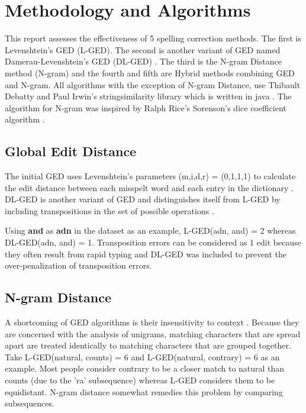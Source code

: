 \documentclass[11pt]{article}
\begin{document}
\section{Methodology and Algorithms}
This report assesses the effectiveness of 5 spelling correction methods. The first is Levenshtein's GED (L-GED)\cite{levenshtein1966binary}. The second is another variant of GED named Damerau-Levenshtein's GED (DL-GED) \cite{damerau1964technique}. The third is the N-gram Distance method (N-gram) \cite{kondrak2005n} and the fourth and fifth are Hybrid methods combining GED and N-gram. All algorithms with the exception of N-gram Distance, use Thibault Debatty and Paul Irwin's stringsimilarity library which is written in java \cite{tdebatty2017}. The algorithm for N-gram was inspired by Ralph Rice's Sorenson's dice coefficient algorithm \cite{rrice2013}.

\subsection{Global Edit Distance}
The initial GED uses Levenshtein's parameters (m,i,d,r) = (0,1,1,1) to calculate the edit distance between each misspelt word and each entry in the dictionary \cite{levenshtein1966binary}. DL-GED is another variant of GED and distinguishes itself from L-GED by including transpositions in the set of possible operations \cite{damerau1964technique}.

Using \textbf{and} as \textbf{adn} in the dataset as an example, L-GED(adn, and) = 2 whereas DL-GED(adn, and) = 1. Transposition errors can be considered as 1 edit because they often result from rapid typing and DL-GED  was included to prevent the over-penalization of transposition errors.

\subsection{N-gram Distance}
A shortcoming of GED algorithms is their insensitivity to context \cite{kondrak2005n}. Because they are concerned with the analysis of unigrams, matching characters that are spread apart are treated identically to matching characters that are grouped together. Take L-GED(natural, counts) = 6 and L-GED(natural, contrary) = 6 as an example. Most people consider contrary to be a closer match to natural than counts (due to the 'ra' subsequence) whereas L-GED considers them to be equidistant. N-gram distance somewhat remedies this problem by comparing subsequences.
\end{document}
